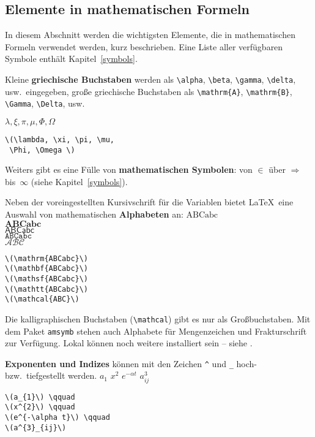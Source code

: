 \subsection{Elemente in mathematischen Formeln}
 
In diesem Abschnitt werden die wichtigsten Elemente, die in
mathematischen Formeln verwendet werden, kurz beschrieben.  Eine
Liste aller verfügbaren Symbole enthält
Kapitel~\ref{symbols}.
 
\bigskip

Kleine \textbf{griechische Buchstaben} werden als \verb|\alpha|,
\verb|\beta|, \verb|\gamma|, \verb|\delta|, usw.\ eingegeben,
große griechische Buchstaben als \verb|\mathrm{A}|,
\verb|\mathrm{B}|, \verb|\Gamma|, \verb|\Delta|, usw.

\exa
\(\lambda, \xi, \pi, \mu,
 \Phi, \Omega \)
\exb
\begin{verbatim}
\(\lambda, \xi, \pi, \mu,
 \Phi, \Omega \)
\end{verbatim}
\exc
 
Weiters gibt es eine Fülle von \textbf{mathematischen Symbolen}:
von \(\in\) über \(\Rightarrow\) bis~\(\infty\) (siehe
Kapitel~\ref{symbols}).
 
\bigskip

Neben der voreingestellten Kursivschrift für die Variablen
bietet \LaTeX\ eine Auswahl von mathematischen \textbf{Alphabeten} an:
\exa
\(\mathrm{ABCabc}\) \\
\(\mathbf{ABCabc}\) \\
\(\mathsf{ABCabc}\) \\
\(\mathtt{ABCabc}\) \\
\(\mathcal{ABC}\)
\exb
\begin{verbatim}
\(\mathrm{ABCabc}\)
\(\mathbf{ABCabc}\)
\(\mathsf{ABCabc}\)
\(\mathtt{ABCabc}\)
\(\mathcal{ABC}\)
\end{verbatim}
\exc
Die kalligraphischen Buchstaben (\verb:\mathcal:) gibt es nur als
Großbuchstaben. Mit dem Paket \texttt{amsymb} \cite{ch8} stehen
auch Alphabete für Mengenzeichen und Frakturschrift zur Verfügung.
Lokal können noch weitere installiert sein -- siehe \local.


\bigskip

\textbf{Exponenten und Indizes} können mit den Zeichen \verb|^|
und \verb|_| hoch- bzw.\ tiefgestellt werden.
\exa
\(a_{1}\) \qquad
\(x^{2}\) \qquad
\(e^{-\alpha t}\) \qquad
\(a^{3}_{ij}\)
\exb
\begin{verbatim}
\(a_{1}\) \qquad
\(x^{2}\) \qquad
\(e^{-\alpha t}\) \qquad
\(a^{3}_{ij}\)
\end{verbatim}
\exc
 
